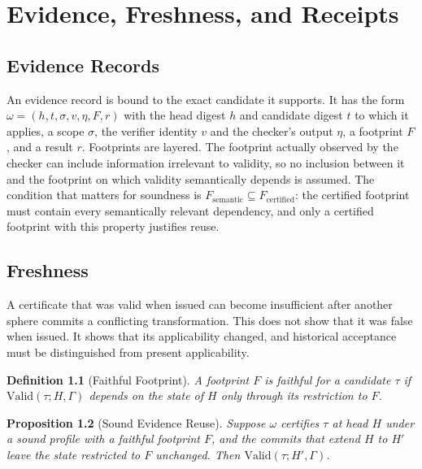 \documentclass[12pt,oneside,openany]{book}
\theoremstyle{spherepop}
\newtheorem{definition}{Definition}[chapter]
\newtheorem{proposition}[definition]{Proposition}
\theoremstyle{remarkstyle}
\begin{document}
\chapter{Evidence, Freshness, and Receipts}
\label{ch:receipts}

\section{Evidence Records}

An evidence record is bound to the exact candidate it supports. It has the form $\omega=(h,t,\sigma,v,\eta,F,r)$ with the head digest $h$ and candidate digest $t$ to which it applies, a scope $\sigma$, the verifier identity $v$ and the checker's output $\eta$, a footprint $F$, and a result $r$. Footprints are layered. The footprint actually observed by the checker can include information irrelevant to validity, so no inclusion between it and the footprint on which validity semantically depends is assumed. The condition that matters for soundness is $F_{\mathrm{semantic}}\subseteq F_{\mathrm{certified}}$: the certified footprint must contain every semantically relevant dependency, and only a certified footprint with this property justifies reuse.

\section{Freshness}

A certificate that was valid when issued can become insufficient after another sphere commits a conflicting transformation. This does not show that it was false when issued. It shows that its applicability changed, and historical acceptance must be distinguished from present applicability.

\begin{definition}[Faithful Footprint]
A footprint $F$ is \emph{faithful} for a candidate $\tau$ if $\mathrm{Valid}(\tau;H,\Gamma)$ depends on the state of $H$ only through its restriction to $F$.
\end{definition}

\begin{proposition}[Sound Evidence Reuse]
\label{prop:reuse}
Suppose $\omega$ certifies $\tau$ at head $H$ under a sound profile with a faithful footprint $F$, and the commits that extend $H$ to $H'$ leave the state restricted to $F$ unchanged. Then $\mathrm{Valid}(\tau;H',\Gamma)$.
\end{proposition}
\end{document}
